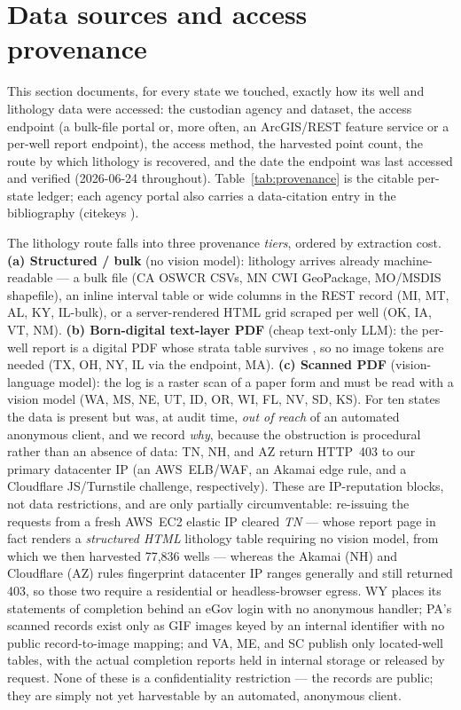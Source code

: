 \documentclass[12pt]{article}
\begin{document}
\section{Data sources and access provenance}
\label{sec:provenance}
This section documents, for every state we touched, exactly how its well and lithology data were
accessed: the custodian agency and dataset, the access endpoint (a bulk-file portal or, more often, an
ArcGIS/REST feature service or a per-well report endpoint), the access method, the harvested point count,
the route by which lithology is recovered, and the date the endpoint was last accessed and verified
(2026-06-24 throughout). Table~\ref{tab:provenance} is the citable per-state ledger; each agency portal
also carries a data-citation entry in the bibliography (citekeys ).

The lithology route falls into three provenance \emph{tiers}, ordered by extraction cost.
\textbf{(a) Structured / bulk} (no vision model): lithology arrives already machine-readable --- a bulk
file (CA OSWCR CSVs, MN CWI GeoPackage, MO/MSDIS shapefile), an inline interval table or wide columns in
the REST record (MI, MT, AL, KY, IL-bulk), or a server-rendered HTML grid scraped per well (OK, IA, VT,
NM). \textbf{(b) Born-digital text-layer PDF} (cheap text-only LLM): the per-well report is a digital PDF
whose strata table survives , so no image tokens are needed (TX, OH, NY, IL via the
 endpoint, MA). \textbf{(c) Scanned PDF} (vision-language model): the log is a raster
scan of a paper form and must be read with a vision model (WA, MS, NE, UT, ID, OR, WI, FL, NV, SD, KS).
For ten states the data is present but was, at audit time, \emph{out of reach} of an automated anonymous
client, and we record \emph{why}, because the obstruction is procedural rather than an absence of data:
TN, NH, and AZ return HTTP~403 to our primary datacenter IP (an AWS~ELB/WAF, an Akamai edge rule, and a
Cloudflare JS/Turnstile challenge, respectively). These are IP-reputation blocks, not data restrictions,
and are only partially circumventable: re-issuing the requests from a fresh AWS~EC2 elastic IP cleared
\emph{TN} --- whose report page in fact renders a \emph{structured HTML} lithology table requiring no vision
model, from which we then harvested 77{,}836 wells --- whereas the Akamai (NH) and Cloudflare (AZ) rules
fingerprint datacenter IP ranges generally and still returned 403, so those two require a residential or
headless-browser egress. WY places
its statements of completion behind an eGov login with no anonymous handler; PA's scanned records exist
only as GIF images keyed by an internal identifier with no public record-to-image mapping; and VA, ME, and
SC publish only located-well tables, with the actual completion reports held in internal storage or
released by request. None of these is a confidentiality restriction --- the records are public; they are
simply not yet harvestable by an automated, anonymous client.
\end{document}
